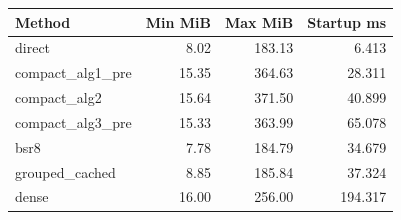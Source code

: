 \begin{tabular}{lrrr}
\toprule
Method & Min MiB & Max MiB & Startup ms \\
\midrule
direct & 8.02 & 183.13 & 6.413 \\
compact\_alg1\_pre & 15.35 & 364.63 & 28.311 \\
compact\_alg2 & 15.64 & 371.50 & 40.899 \\
compact\_alg3\_pre & 15.33 & 363.99 & 65.078 \\
bsr8 & 7.78 & 184.79 & 34.679 \\
grouped\_cached & 8.85 & 185.84 & 37.324 \\
dense & 16.00 & 256.00 & 194.317 \\
\bottomrule
\end{tabular}
